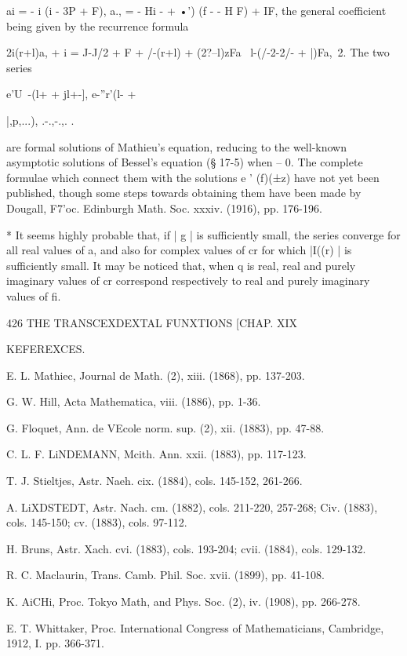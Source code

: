{{ai = -  i (i - 3P + F), a., = - Hi -    +  •') (f - - H F) + IF, 
the general coefficient being given by the recurrence formula 

2i(r+l)a, + i =  J-J/2 + F + /-(r+l)  + (2?--l)zFa \ l-(/-2-2/- + |)Fa,\ 2. 
The two series 



e'U~-(l+  + jl+-], e-''r'(l-  + 



|,p,...), .-.,-.,.  . \  



are formal solutions of Mathieu's equation, reducing to the well-known asymptotic 
solutions of Bessel's equation (§ 17-5) when  -- 0. The complete formulae which connect 
them with the solutions e '  (f)(±z) have not yet been published, though some steps 
towards obtaining them have been made by Dougall, F7'oc. Edinburgh Math. Soc. xxxiv. 
(1916), pp. 176-196. 

* It seems highly probable that, if | g | is sufficiently small, the series converge for all real 
values of a, and also for complex values of cr for which |I((r) | is sufficiently small. It may be 
noticed that, when q is real, real and purely imaginary values of cr correspond respectively 
to real and purely imaginary values of fi. 



426 THE TRANSCEXDEXTAL FUNXTIONS [CHAP. XIX 

KEFEREXCES. 

E. L. Mathiec, Journal de Math. (2), xiii. (1868), pp. 137-203. 

G. W. Hill, Acta Mathematica, viii. (1886), pp. 1-36. 

G. Floquet, Ann. de VEcole norm. sup. (2), xii. (1883), pp. 47-88. 

C. L. F. LiNDEMANN, Mcith. Ann. xxii. (1883), pp. 117-123. 

T. J. Stieltjes, Astr. Naeh. cix. (1884), cols. 145-152, 261-266. 

A. LiXDSTEDT, Astr. Nach. cm. (1882), cols. 211-220, 257-268; Civ. (1883), cols. 
145-150; cv. (1883), cols. 97-112. 

H. Bruns, Astr. Xach. cvi. (1883), cols. 193-204; cvii. (1884), cols. 129-132. 

R. C. Maclaurin, Trans. Camb. Phil. Soc. xvii. (1899), pp. 41-108. 

K. AiCHi, Proc. Tokyo Math, and Phys. Soc. (2), iv. (1908), pp. 266-278. 

E. T. Whittaker, Proc. International Congress of Mathematicians, Cambridge, 1912, 
I. pp. 366-371. 

}}
